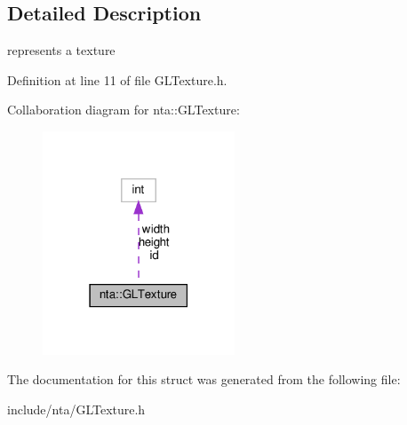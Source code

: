 \subsection{Detailed Description}
represents a texture 

Definition at line 11 of file G\+L\+Texture.\+h.



Collaboration diagram for nta\+:\+:G\+L\+Texture\+:\nopagebreak
\begin{figure}[H]
\begin{center}
\leavevmode
\includegraphics[width=162pt]{d3/d3e/structnta_1_1GLTexture__coll__graph}
\end{center}
\end{figure}


The documentation for this struct was generated from the following file\+:\begin{DoxyCompactItemize}
\item 
include/nta/G\+L\+Texture.\+h\end{DoxyCompactItemize}
